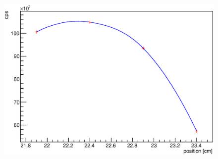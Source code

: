 \begin{figure}
\begin{minipage}[d]{0.24 \textwidth}
	\end{minipage}
	\begin{minipage}[d]{0.24 \textwidth}
		  \includegraphics[width=\textwidth]{graphics/cobalt/modules/2A.eps}
	\end{minipage}\newline
	

\end{figure}
